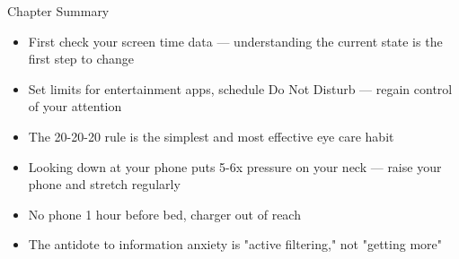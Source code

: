 \begin{tcbsummary}{Chapter Summary}
\begin{itemize}
  \item First check your screen time data — understanding the current state is the first step to change
  \item Set limits for entertainment apps, schedule Do Not Disturb — regain control of your attention
  \item The 20-20-20 rule is the simplest and most effective eye care habit
  \item Looking down at your phone puts 5-6x pressure on your neck — raise your phone and stretch regularly
  \item No phone 1 hour before bed, charger out of reach
  \item The antidote to information anxiety is "active filtering," not "getting more"
\end{itemize}

\end{tcbsummary}
